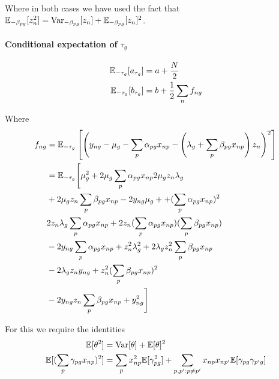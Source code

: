 Where in both cases we have used the fact that $\mathbb{E}_{-\beta_{pg}} [z_n^2] = \text{Var}_{-\beta_{pg}}[z_n] + \mathbb{E}_{-\beta_{pg}}[z_n]^2$.

\paragraph{Conditional expectation of $\tau_g$}
\begin{equation}
\begin{aligned}
\mathbb{E}_{-\tau_g}[a_{\tau_g}] & = a + \frac{N}{2} \\
\mathbb{E}_{-\tau_g}[b_{\tau_g}] & = b + \frac{1}{2} \sum_n f_{ng}
\end{aligned}
\end{equation}

Where
\begin{equation}
\begin{aligned}
f_{ng}  & =  \Ex_{-\tau_g} \left[ \left(y_{ng} - \mu_g - \sum_p \alpha_{pg} x_{np} - \left( \lambda_g + \sum_p \beta_{pg} x_{np} \right) z_n
\right)^2 \right] \\
 & =   \Ex_{-\tau_g} \Bigg[ 
\mu_g^2 +  %
2 \mu_g \sum_p \alpha_{pg} x_{np} %
2 \mu_g z_n \lambda_g  \\%
& + 2 \mu_g z_n \sum_p \beta_{pg} x_{np} %
- 2 y_{ng} \mu_g + %
+ (\sum_p \alpha_{pg} x_{np})^2 \\ %
& 2 z_n \lambda_g \sum_p \alpha_{pg} x_{np} %
+ 2 z_n (\sum_p \alpha_{pg} x_{np})(\sum_p\beta_{pg} x_{np}) \\ %
& - 2 y_{ng} \sum_p \alpha_{pg} x_{np}  %
+ z_n^2 \lambda_g^2 %
+ 2 \lambda_g z_n^2 \sum_p \beta_{pg} x_{np} \\ %
& - 2 \lambda_g z_n y_{ng}  %
+ z_n^2 (\sum_p \beta_{pg}x_{np})^2  \\ %
& - 2 y_{ng} z_n \sum_p \beta_{pg}x_{np} %
+ y_{ng}^2 %
\Bigg]
\end{aligned}
\end{equation}

For this we require the identities
\begin{equation}
\begin{aligned}
\mathbb{E}[\theta^2] & = \text{Var}[\theta] + \mathbb{E}[\theta]^2 \\
\mathbb{E}[(\sum_p \gamma_{pg} x_{np})^2] & = \sum_p x_{np}^2 \mathbb{E}[\gamma_{pg}^2] +
\sum_{p,p': p \neq p'} x_{np} x_{np'} \mathbb{E}[\gamma_{pg} \gamma_{p'g}]
\end{aligned}
\end{equation}

